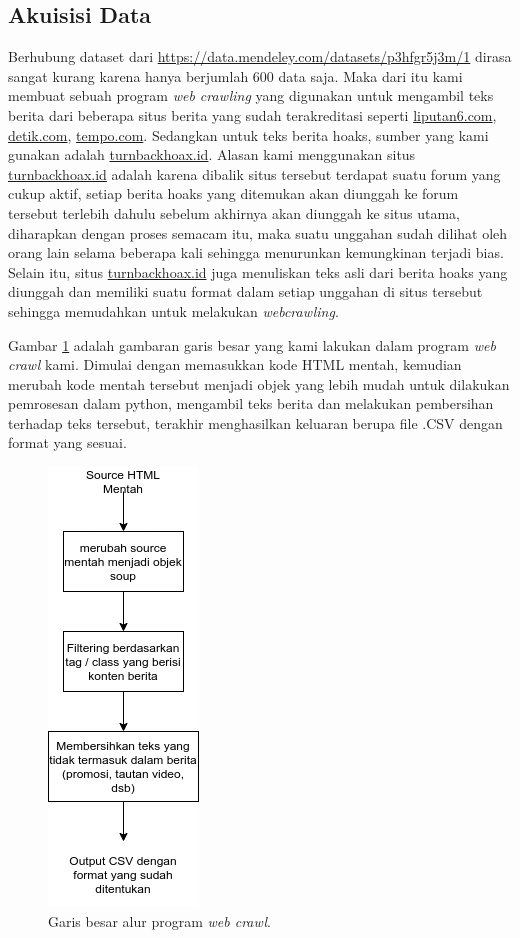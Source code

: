 \subsection{Akuisisi Data}
Berhubung dataset dari \url{https://data.mendeley.com/datasets/p3hfgr5j3m/1} dirasa sangat kurang karena hanya berjumlah 600 data saja. Maka dari itu kami membuat sebuah program \textit{web crawling} yang digunakan untuk mengambil teks berita dari beberapa situs berita yang sudah terakreditasi seperti \url{liputan6.com}, \url{detik.com}, \url{tempo.com}. Sedangkan untuk teks berita hoaks, sumber yang kami gunakan adalah \url{turnbackhoax.id}. Alasan kami menggunakan situs \url{turnbackhoax.id} adalah karena dibalik situs tersebut terdapat suatu forum yang cukup aktif, setiap berita hoaks yang ditemukan akan diunggah ke forum tersebut terlebih dahulu sebelum akhirnya akan diunggah ke situs utama, diharapkan dengan proses semacam itu, maka suatu unggahan sudah dilihat oleh orang lain selama beberapa kali sehingga menurunkan kemungkinan terjadi bias. Selain itu, situs \url{turnbackhoax.id} juga menuliskan teks asli dari berita hoaks yang diunggah dan memiliki suatu format dalam setiap unggahan di situs tersebut sehingga memudahkan untuk melakukan \textit{webcrawling}.

Gambar \ref{fig:webcrawl_method} adalah gambaran garis besar yang kami lakukan dalam program \textit{web crawl} kami. Dimulai dengan memasukkan kode HTML mentah, kemudian merubah kode mentah tersebut menjadi objek yang lebih mudah untuk dilakukan pemrosesan dalam python, mengambil teks berita dan melakukan pembersihan terhadap teks tersebut, terakhir menghasilkan keluaran berupa file .CSV dengan format yang sesuai.

\begin{figure} [ht]
    \centering
    \includegraphics[width=0.35\linewidth]{gambar/webcrawl_long.png}
    \caption{Garis besar alur program \textit{web crawl}.}
    \label{fig:webcrawl_method}
\end{figure}

